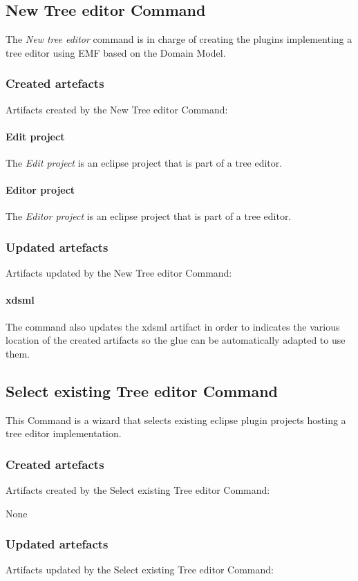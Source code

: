 \documentclass{gemoc} %
\begin{document}
\subsection{New Tree editor Command}
The \emph{New tree editor} command is in charge of creating the plugins implementing a tree editor using EMF based on the Domain Model.
\subsubsection{Created artefacts}
Artifacts created by the New Tree editor Command:
\paragraph{Edit project} 
The \emph{Edit project} is an eclipse project that is part of a tree editor.\paragraph{Editor project} 
The \emph{Editor project} is an eclipse project that is part of a tree editor.
\subsubsection{Updated artefacts}
Artifacts updated by the New Tree editor Command:
\paragraph{xdsml} 
The command also updates the xdsml artifact in order to indicates the various location of the created artifacts so the glue can be automatically adapted to use them.

\subsection{Select existing Tree editor Command}
This Command is a wizard that selects existing eclipse plugin projects hosting a tree editor implementation.
\subsubsection{Created artefacts}
Artifacts created by the Select existing Tree editor Command:

	None
\subsubsection{Updated artefacts}
Artifacts updated by the Select existing Tree editor Command:
\end{document}
